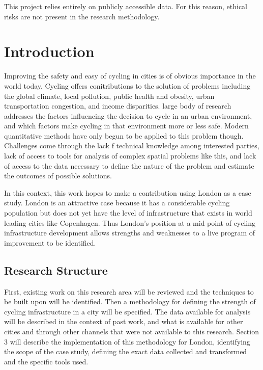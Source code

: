 \documentclass[11pt]{article} %
\begin{document}
This project relies entirely on publicly accessible data. For this reason, ethical risks are not present in the research methodology.  

\section{Introduction}

Improving the safety and easy of cycling in cities is of obvious importance in the world today. Cycling offers conitributions to the solution of problems including the global climate, local pollution, public health and obesity, urban transportation congestion, and income disparities.  large body of research addresses the factors influencing the decision to cycle in an urban environment, and which factors make cycling in that environment more or less safe. Modern quantitative methods have only begun to be applied to this problem though. Challenges come through the lack f technical knowledge among interested parties, lack of access to tools for analysis of complex spatial problems like this, and lack of access to the data necessary to define the nature of the problem and estimate the outcomes of possible solutions. 

In this context, this work hopes to make a contribution using London as a case study. London is an attractive case because it has a considerable cycling population but does not yet have the level of infrastructure that exists in world leading cities like Copenhagen. Thus London's position at a mid point of cycling infrastructure development allows strengths and weaknesses to a live program of improvement to be identified. 

\subsection{Research Structure}

First, existing work on this research area will be reviewed and the techniques to be built upon will be identified.  Then a methodology for defining the strength of cycling infrastructure in a city will be specified. The data available for analysis will be described in the context of past work, and what is available for other cities and through other channels that were not available to this research. Section 3 will describe the implementation of this methodology for London, identifying the scope of the case study, defining the exact data collected and transformed and the specific tools used. 
\end{document}
